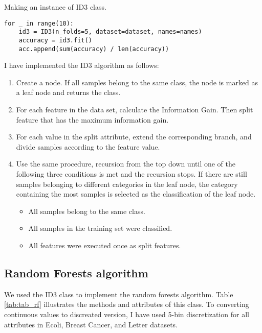 \begin{table}[H]
\centering
\caption{Making an instance of ID3 class.}
\begin{lstlisting}
for _ in range(10):
    id3 = ID3(n_folds=5, dataset=dataset, names=names)
    accuracy = id3.fit()
    acc.append(sum(accuracy) / len(accuracy))
\end{lstlisting}
\end{table}


I have implemented the ID3 algorithm as follows:
\begin{enumerate}
    \item Create a node. If all samples belong to the same class, the node is marked as a leaf node and returns the class.

    \item For each feature in the data set, calculate the Information Gain. Then split feature that has the maximum information gain.
        
    \item For each value in the split attribute, extend the corresponding branch, and divide samples according to the feature value.
    
    \item Use the same procedure, recursion from the top down until one of the following three conditions is met and the recursion stops. If there are still samples belonging to different categories in the leaf node, the category containing the most samples is selected as the classification of the leaf node.


    \begin{itemize}
        \item All samples belong to the same class.
        \item All samples in the training set were classified.
        \item All features were executed once as split features.
    \end{itemize}
\end{enumerate}












\subsection{Random Forests algorithm}
We used the ID3 class to implement the random forests algorithm. Table \ref{tab:tab_rf} illustrates the methods and attributes of this class.  To converting continuous values to discreated version, I have used 5-bin discretization for all attributes in Ecoli, Breast Cancer, and Letter datasets.

